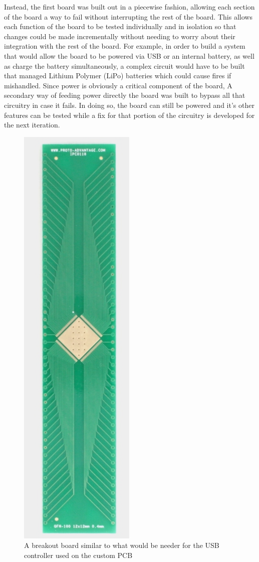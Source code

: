 Instead, the first board was built out in a piecewise fashion, allowing each section of the board a way to fail without interrupting the rest of the board.
This allows each function of the board to be tested individually and in isolation so that changes could be made incrementally without needing to worry about their integration with the rest of the board.
For example, in order to build a system that would allow the board to be powered via USB or an internal battery, as well as charge the battery simultaneously, a complex circuit would have to be built that managed Lithium Polymer (LiPo) batteries which could cause fires if mishandled.
Since power is obviously a critical component of the board, A secondary way of feeding power directly the board was built to bypass all that circuitry in case it fails.
In doing so, the board can still be powered and it's other features can be tested while a fix for that portion of the circuitry is developed for the next iteration.

\begin{figure}[h]
  \centering
  \includegraphics[height=0.9\textwidth,angle=90]{Figures/smt_breakout}
  \captionsetup{width=.8\linewidth}
  \caption[SMD Breakout Board]{A breakout board similar to what would be needer for the USB controller used on the custom PCB}
  \label{fig:smt_breakout}
\end{figure}


